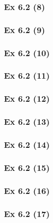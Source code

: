 \subsubsection{Ex 6.2 (8)}\label{sec:Ex_6.2.8}

\subsubsection{Ex 6.2 (9)}\label{sec:Ex_6.2.9}

\subsubsection{Ex 6.2 (10)}\label{sec:Ex_6.2.10}

\newpage		%

\subsubsection{Ex 6.2 (11)}\label{sec:Ex_6.2.11}

\subsubsection{Ex 6.2 (12)}\label{sec:Ex_6.2.12}

\subsubsection{Ex 6.2 (13)}\label{sec:Ex_6.2.13}

\subsubsection{Ex 6.2 (14)}\label{sec:Ex_6.2.14}

\subsubsection{Ex 6.2 (15)}\label{sec:Ex_6.2.15}

\subsubsection{Ex 6.2 (16)}\label{sec:Ex_6.2.16}

\subsubsection{Ex 6.2 (17)}\label{sec:Ex_6.2.17}

